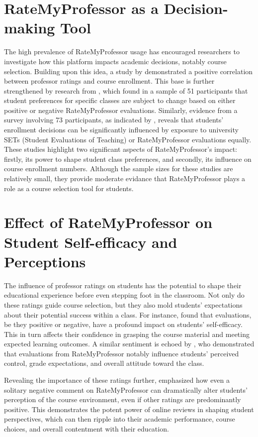 \documentclass[twocolumn, doc,12pt]{apa7}
\begin{document}
\section{RateMyProfessor as a Decision-making Tool}
The high prevalence of RateMyProfessor usage has encouraged researchers to investigate how this platform impacts academic decisions, notably course selection. Building upon this idea, a study by \textcite{johnson_i_2014} demonstrated a positive correlation between professor ratings and course enrollment. This base is further strengthened by research from \textcite{orlova_ratemyprofessorscom_2021}, which found in a sample of 51 participants that student preferences for specific classes are subject to change based on either positive or negative RateMyProfessor evaluations. Similarly, evidence from a survey involving 73 participants, as indicated by \textcite{boswell_effects_2020}, reveals that students' enrollment decisions can be significantly influenced by exposure to university SETs (Student Evaluations of Teaching) or RateMyProfessor evaluations equally. These studies highlight two significant aspects of RateMyProfessor's impact: firstly, its power to shape student class preferences, and secondly, its influence on course enrollment numbers. Although the sample sizes for these studies are relatively small, they provide moderate evidance that RateMyProfessor plays a role as a course selection tool for students.

\section{Effect of RateMyProfessor on Student Self-efficacy and Perceptions}
The influence of professor ratings on students has the potential to shape their educational experience before even stepping foot in the classroom. Not only do these ratings guide course selection, but they also mold students' expectations about their potential success within a class. For instance, \textcite{boswell_effects_2020} found that evaluations, be they positive or negative, have a profound impact on students' self-efficacy. This in turn affects their confidence in grasping the course material and meeting expected learning outcomes. A similar sentiment is echoed by \textcite{kowai-bell_rate_2011}, who demonstrated that evaluations from RateMyProfessor notably influence students' perceived control, grade expectations, and overall attitude toward the class.

Revealing the importance of these ratings further, \textcite{scherr_single_2013} emphasized how even a solitary negative comment on RateMyProfessor can dramatically alter students' perception of the course environment, even if other ratings are predominantly positive. This demonstrates the potent power of online reviews in shaping student perspectives, which can then ripple into their academic performance, course choices, and overall contentment with their education.
\end{document}
